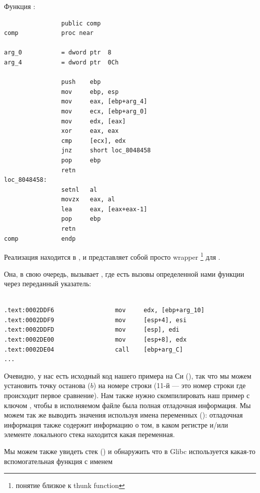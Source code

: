 Функция \comp:

\begin{lstlisting}
                public comp
comp            proc near

arg_0           = dword ptr  8
arg_4           = dword ptr  0Ch

                push    ebp
                mov     ebp, esp
                mov     eax, [ebp+arg_4]
                mov     ecx, [ebp+arg_0]
                mov     edx, [eax]
                xor     eax, eax
                cmp     [ecx], edx
                jnz     short loc_8048458
                pop     ebp
                retn
loc_8048458:
                setnl   al
                movzx   eax, al
                lea     eax, [eax+eax-1]
                pop     ebp
                retn
comp            endp
\end{lstlisting}

Реализация \qsort находится в , и представляет собой просто wrapper
\footnote{понятие близкое к \gls{thunk function}} для .

Она, в свою очередь, вызывает , где есть вызовы определенной нами функции через переданный указатель:


\begin{lstlisting}[caption=
(файл libc.so.6{,} версия glibc\EMDASH{}2.10.1)]

.text:0002DDF6                 mov     edx, [ebp+arg_10]
.text:0002DDF9                 mov     [esp+4], esi
.text:0002DDFD                 mov     [esp], edi
.text:0002DE00                 mov     [esp+8], edx
.text:0002DE04                 call    [ebp+arg_C]
...
\end{lstlisting}


Очевидно, у нас есть исходный код нашего примера на Си (), 
так что мы можем установить точку останова ($b$) на номере строки
(11-й --- это номер строки где происходит первое сравнение).
Нам также нужно скомпилировать наш пример с ключом , чтобы в исполняемом файле была
полная отладочная информация.
Мы можем так же выводить значения используя имена переменных ():
отладочная информация также содержит информацию о том, в каком регистре и/или элементе локального
стека находится какая переменная.

Мы можем также увидеть стек () и обнаружить что в Glibc используется какая-то вспомогательная функция с именем
 
